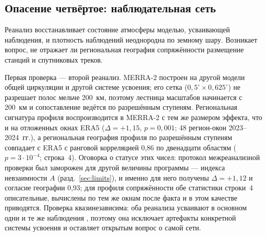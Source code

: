 \documentclass[11pt,a4paper]{article}
\begin{document}
\subsection{Опасение четвёртое: наблюдательная сеть}
\label{sec:obs}

Реанализ восстанавливает состояние атмосферы моделью, усваивающей наблюдения, и плотность наблюдений неоднородна по земному шару. Возникает вопрос, не отражает ли региональная география сопряжённости размещение станций и спутниковых треков.

Первая проверка --- второй реанализ. MERRA-2 \cite{Gelaro2017} построен на другой модели общей циркуляции и другой системе усвоения; его сетка ($0{,}5^\circ\times0{,}625^\circ$) не разрешает полос мельче 200~км, поэтому лестница масштабов начинается с 200~км и сопоставление ведётся по разрешённым ступеням. Региональная сигнатура профиля воспроизводится в MERRA-2 с тем же размером эффекта, что и на отложенных окнах ERA5 ($\Delta=+1{,}15$, $p=0{,}001$; 48 регион-окон 2023--2024~гг.), а региональная география профиля по разрешённым ступеням совпадает с ERA5 с ранговой корреляцией 0,86 по двенадцати областям ($p=3\cdot10^{-4}$; строка~4). Оговорка о статусе этих чисел: протокол межреанализной проверки был заморожен для другой величины программы --- индекса невзаимности $A$ (разд.~\ref{sec:limits}), и именно для него получены $\Delta=+1{,}12$ и согласие географии 0,93; для профиля сопряжённости обе статистики строки~4 описательные, вычислены по тем же окнам после факта и в этом качестве приводятся. Проверка квазинезависима: оба реанализа усваивают в основном одни и те же наблюдения \cite{Hersbach2020,Gelaro2017}, поэтому она исключает артефакты конкретной системы усвоения и оставляет открытым вопрос о самой сети.
\end{document}
